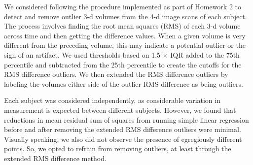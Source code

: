 
\par \indent We considered following the procedure implemented as part of Homework 2 to 
detect and remove outlier 3-d volumes from the 4-d image scans of each subject. 
The process involves finding the root mean squares (RMS) of each 3-d volume 
across time and then getting the difference values. When a given volume is very 
different from the preceding volume, this may indicate a potential outlier or 
the sign of an artifact. We used thresholds based on 1.5 $\times$ IQR added to 
the 75th percentile and subtracted from the 25th percentile to create the 
cutoffs for the RMS difference outliers. We then extended the RMS difference 
outliers by labeling the volumes either side of the outlier RMS difference as 
being outliers. 

\par Each subject was considered independently, as considerable variation in 
measurement is expected between different subjects. However, we found that 
reductions in mean residual sum of squares from running simple linear regression 
before and after removing the extended RMS difference outliers were minimal. 
Visually speaking, we also did not observe the presence of egregiously different 
points. So, we opted to refrain from removing outliers, at least through the 
extended RMS difference method. 


